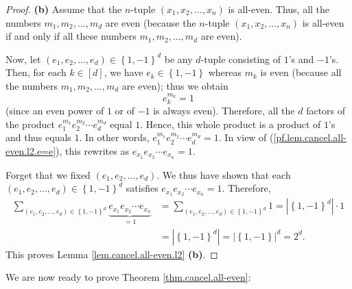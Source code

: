 \begin{proof}
\textbf{(b)} Assume that the $n$-tuple $\left(  x_{1},x_{2},\ldots
,x_{n}\right)  $ is all-even. Thus, all the numbers $m_{1},m_{2},\ldots,m_{d}$
are even (because the $n$-tuple $\left(  x_{1},x_{2},\ldots,x_{n}\right)  $ is
all-even if and only if all these numbers $m_{1},m_{2},\ldots,m_{d}$ are even).

Now, let $\left(  e_{1},e_{2},\ldots,e_{d}\right)  \in\left\{  1,-1\right\}
^{d}$ be any $d$-tuple consisting of $1$'s and $-1$'s. Then, for each
$k\in\left[  d\right]  $, we have $e_{k}\in\left\{  1,-1\right\}  $ whereas
$m_{k}$ is even (because all the numbers $m_{1},m_{2},\ldots,m_{d}$ are even);
thus we obtain%
\begin{equation}
e_{k}^{m_{k}}=1 \label{pf.lem.cancel.all-even.l2.b.1}%
\end{equation}
(since an even power of $1$ or of $-1$ is always even). Therefore, all the $d$
factors of the product $e_{1}^{m_{1}}e_{2}^{m_{2}}\cdots e_{d}^{m_{d}}$ equal
$1$. Hence, this whole product is a product of $1$'s and thus equals $1$. In
other words, $e_{1}^{m_{1}}e_{2}^{m_{2}}\cdots e_{d}^{m_{d}}=1$. In view of
(\ref{pf.lem.cancel.all-even.l2.e=e}), this rewrites as $e_{x_{1}}e_{x_{2}%
}\cdots e_{x_{n}}=1$.

Forget that we fixed $\left(  e_{1},e_{2},\ldots,e_{d}\right)  $. We thus have
shown that each $\left(  e_{1},e_{2},\ldots,e_{d}\right)  \in\left\{
1,-1\right\}  ^{d}$ satisfies $e_{x_{1}}e_{x_{2}}\cdots e_{x_{n}}=1$.
Therefore,%
\begin{align*}
\sum_{\left(  e_{1},e_{2},\ldots,e_{d}\right)  \in\left\{  1,-1\right\}  ^{d}%
}\underbrace{e_{x_{1}}e_{x_{2}}\cdots e_{x_{n}}}_{=1}  &  =\sum_{\left(
e_{1},e_{2},\ldots,e_{d}\right)  \in\left\{  1,-1\right\}  ^{d}}1=\left\vert
\left\{  1,-1\right\}  ^{d}\right\vert \cdot1\\
&  =\left\vert \left\{  1,-1\right\}  ^{d}\right\vert =\left\vert \left\{
1,-1\right\}  \right\vert ^{d}=2^{d}.
\end{align*}
This proves Lemma \ref{lem.cancel.all-even.l2} \textbf{(b)}.
\end{proof}

We are now ready to prove Theorem \ref{thm.cancel.all-even}:

